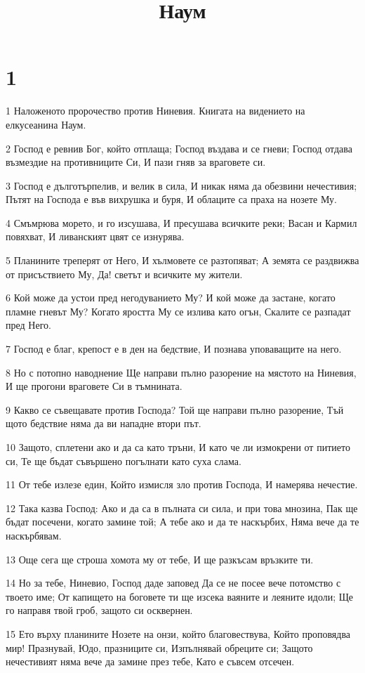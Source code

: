

\title{Наум}


\chapter{1}

\par 1 Наложеното пророчество против Ниневия. Книгата на видението на елкусеанина Наум.
\par 2 Господ е ревнив Бог, който отплаща; Господ въздава и се гневи; Господ отдава възмездие на противниците Си, И пази гняв за враговете си.
\par 3 Господ е дълготърпелив, и велик в сила, И никак няма да обезвини нечестивия; Пътят на Господа е във вихрушка и буря, И облаците са праха на нозете Му.
\par 4 Смъмрюва морето, и го изсушава, И пресушава всичките реки; Васан и Кармил повяхват, И ливанският цвят се изнурява.
\par 5 Планините треперят от Него, И хълмовете се разтопяват; А земята се раздвижва от присъствието Му, Да! светът и всичките му жители.
\par 6 Кой може да устои пред негодуванието Му? И кой може да застане, когато пламне гневът Му? Когато яростта Му се излива като огън, Скалите се разпадат пред Него.
\par 7 Господ е благ, крепост е в ден на бедствие, И познава уповаващите на него.
\par 8 Но с потопно наводнение Ще направи пълно разорение на мястото на Ниневия, И ще прогони враговете Си в тъмнината.
\par 9 Какво се съвещавате против Господа? Той ще направи пълно разорение, Тъй щото бедствие няма да ви нападне втори път.
\par 10 Защото, сплетени ако и да са като тръни, И като че ли измокрени от питието си, Те ще бъдат съвършено погълнати като суха слама.
\par 11 От тебе излезе един, Който измисля зло против Господа, И намерява нечестие.
\par 12 Така казва Господ: Ако и да са в пълната си сила, и при това мнозина, Пак ще бъдат посечени, когато замине той; А тебе ако и да те наскърбих, Няма вече да те наскърбявам.
\par 13 Още сега ще строша хомота му от тебе, И ще разкъсам връзките ти.
\par 14 Но за тебе, Ниневио, Господ даде заповед Да се не посее вече потомство с твоето име; От капището на боговете ти ще изсека ваяните и леяните идоли; Ще го направя твой гроб, защото си осквернен.
\par 15 Ето върху планините Нозете на онзи, който благовествува, Който проповядва мир! Празнувай, Юдо, празниците си, Изпълнявай обреците си; Защото нечестивият няма вече да замине през тебе, Като е съвсем отсечен.


